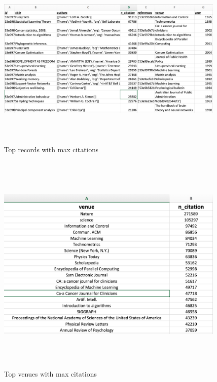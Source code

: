 \documentclass[a4paper, 11pt]{article}
\begin{document}
\begin{figure}[h]
    \centering
    \includegraphics[width=17cm,height=9cm]{top_papers}
    \caption{Top records with max citations}
    \label{fig:top_papers}
\end{figure}

\begin{figure}[h]
    \centering
    \includegraphics[width=17cm,height=11cm]{top_venues}
    \caption{Top venues with max citations}
    \label{fig:top_venues}
\end{figure}
\end{document}
